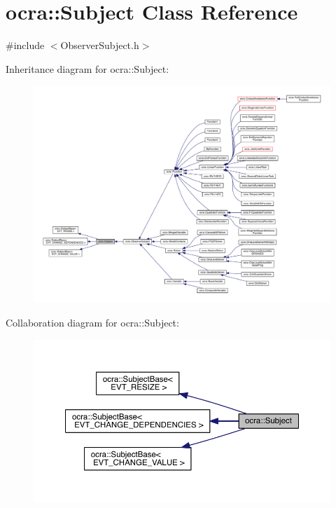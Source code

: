 \hypertarget{classocra_1_1Subject}{}\section{ocra\+:\+:Subject Class Reference}
\label{classocra_1_1Subject}


{\ttfamily \#include $<$Observer\+Subject.\+h$>$}



Inheritance diagram for ocra\+:\+:Subject\+:\nopagebreak
\begin{figure}[H]
\begin{center}
\leavevmode
\includegraphics[width=350pt]{db/d61/classocra_1_1Subject__inherit__graph}
\end{center}
\end{figure}


Collaboration diagram for ocra\+:\+:Subject\+:\nopagebreak
\begin{figure}[H]
\begin{center}
\leavevmode
\includegraphics[width=350pt]{d3/d12/classocra_1_1Subject__coll__graph}
\end{center}
\end{figure}
